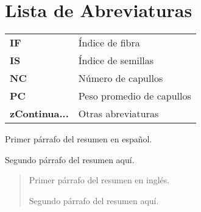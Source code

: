 \documentclass[12pt,oneside]{reedthesis}
\begin{document}
\chapter*{Lista de Abreviaturas}
\begin{table}[h]
    \centering
    \begin{tabular}{ll}
                \textbf{IF} & Índice de fibra \\
                \textbf{IS} & Índice de semillas \\
                \textbf{NC} & Número de capullos \\
                \textbf{PC} & Peso promedio de capullos \\
                \textbf{zContinua...} & Otras abreviaturas \\
            \end{tabular}
\end{table}
\thispagestyle{fancy} %
    \fancyhf{} %
    \fancyhead{} %
    \fancyfoot[R]{\thepage} %

  \begin{resumen}
    Primer párrafo del resumen en español.

    \par

    Segundo párrafo del resumen aquí.
    \thispagestyle{fancy} %
    \fancyhf{} %
    \fancyhead{} %
    \fancyfoot[R]{\thepage} %
  \end{resumen}

  \begin{abstract}
    Primer párrafo del resumen en inglés.

    \par

    Segundo párrafo del resumen aquí.
    \thispagestyle{fancy} %
    \fancyhf{} %
    \fancyhead{} %
    \fancyfoot[R]{\thepage} %
  \end{abstract}

  \listoftables
  \thispagestyle{fancy} %
  \fancyhf{} %
  \fancyhead{} %
  \fancyfoot[R]{\thepage} %
\end{document}
